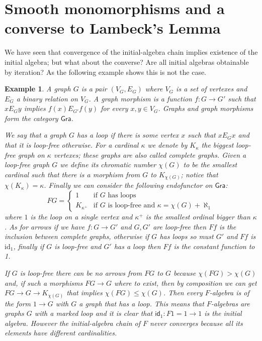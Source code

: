\documentclass[letterpaper, 11pt, oneside]{memoir}
\theoremstyle{myteo}
\newtheorem{example}[theorem]{Example}
\numberwithin{equation}{section}
\newcommand{\id}{\textsf{id}}
\begin{document}
\section{Smooth monomorphisms and a converse to Lambeck's Lemma}

We have seen that convergence of the initial-algebra chain implies existence of the initial algebra; but what about the converse?
Are all initial algebras obtainable by iteration?
As the following example shows this is not the case.

\begin{example}
  A graph \(G\) is a pair \((V_G, E_G)\) where \(V_G\) is a set of vertexes and \(E_G\) a binary relation on \(V_G\).
  A graph morphism is a function \(f : G \to G'\) such that \(x E_G y\) implies \(f(x) E_{G'} f(y)\) for every \(x, y \in V_G\).
  Graphs and graph morphisms form the category \(\textsf{Gra}\).

  We say that a graph \(G\) has a loop if there is some vertex \(x\) such that \(x E_G x\) and that it is loop-free otherwise.
  For a cardinal \(\kappa\) we denote by \(K_\kappa\) the biggest loop-free graph on \(\kappa\) vertexes; these graphs are also called complete graphs.
  Given a loop-free graph \(G\) we define its chromatic number \(\chi(G)\) to be the smallest cardinal such that there is a morphism from \(G\) to \(K_{\chi(G)}\); notice that \(\chi(K_\kappa) = \kappa\).
  Finally we can consider the following endofunctor on \(\textsf{Gra}\):
  \begin{equation*}
    FG = \begin{cases}
      1 & \text{if \(G\) has loops}\\
      K_{\kappa^+} & \text{if \(G\) is loop-free and \(\kappa = \chi(G) + \aleph_1\)}
    \end{cases}
  \end{equation*}
  where \(1\) is the loop on a single vertex and \(\kappa^+\) is the smallest ordinal bigger than \(\kappa\).
  As for arrows if we have \(f: G \to G'\) and \(G, G'\) are loop-free then \(Ff\) is the inclusion between complete graphs, otherwise if \(G\) has loops so must \(G'\) and \(Ff\) is \(\text{id}_1\), finally if \(G\) is loop-free and \(G'\) has a loop then \(Ff\) is the constant function to 1.

  If \(G\) is loop-free there can be no arrows from \(FG\) to \(G\) because \(\chi(FG) > \chi(G)\) and, if such a morphisms \(FG \to G\) where to exist, then by composition we can get \(FG \to G \to K_{\chi(G)}\) that implies \(\chi(FG) \leq \chi(G)\).
  Then every \(F\)-algebra is of the form \(1 \to G\) with \(G\) a graph that has a loop.
  This means that \(F\)-algebras are graphs \(G\) with a marked loop and it is clear that \(\id_1 : F1 = 1 \to 1\) is the initial algebra.
  However the initial-algebra chain of \(F\) never converges because all its elements have different cardinalities.
\end{example}
\end{document}
